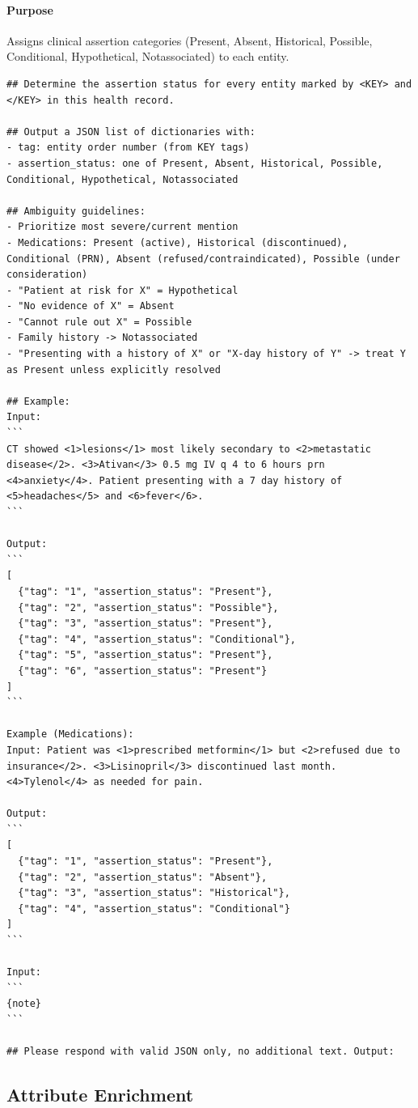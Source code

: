 \paragraph{Purpose} Assigns clinical assertion categories (Present, Absent, Historical, Possible, Conditional, Hypothetical, Notassociated) to each entity.
\begin{lstlisting}
## Determine the assertion status for every entity marked by <KEY> and </KEY> in this health record.

## Output a JSON list of dictionaries with:
- tag: entity order number (from KEY tags)
- assertion_status: one of Present, Absent, Historical, Possible, Conditional, Hypothetical, Notassociated

## Ambiguity guidelines:
- Prioritize most severe/current mention
- Medications: Present (active), Historical (discontinued), Conditional (PRN), Absent (refused/contraindicated), Possible (under consideration)
- "Patient at risk for X" = Hypothetical
- "No evidence of X" = Absent
- "Cannot rule out X" = Possible
- Family history -> Notassociated
- "Presenting with a history of X" or "X-day history of Y" -> treat Y as Present unless explicitly resolved

## Example:
Input:
```
CT showed <1>lesions</1> most likely secondary to <2>metastatic disease</2>. <3>Ativan</3> 0.5 mg IV q 4 to 6 hours prn <4>anxiety</4>. Patient presenting with a 7 day history of <5>headaches</5> and <6>fever</6>.
```

Output:
```
[
  {"tag": "1", "assertion_status": "Present"},
  {"tag": "2", "assertion_status": "Possible"},
  {"tag": "3", "assertion_status": "Present"},
  {"tag": "4", "assertion_status": "Conditional"},
  {"tag": "5", "assertion_status": "Present"},
  {"tag": "6", "assertion_status": "Present"}
]
```

Example (Medications):
Input: Patient was <1>prescribed metformin</1> but <2>refused due to insurance</2>. <3>Lisinopril</3> discontinued last month. <4>Tylenol</4> as needed for pain.

Output:
```
[
  {"tag": "1", "assertion_status": "Present"},
  {"tag": "2", "assertion_status": "Absent"},
  {"tag": "3", "assertion_status": "Historical"},
  {"tag": "4", "assertion_status": "Conditional"}
]
```

Input:
```
{note}
```

## Please respond with valid JSON only, no additional text. Output:
\end{lstlisting}

\subsection{Attribute Enrichment}
